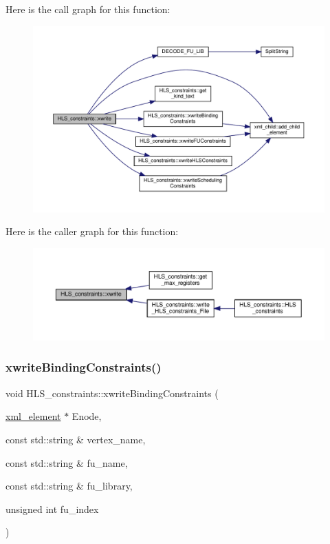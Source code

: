 Here is the call graph for this function\+:
\nopagebreak
\begin{figure}[H]
\begin{center}
\leavevmode
\includegraphics[width=350pt]{dd/d96/classHLS__constraints_ab4c4cb541597b8ac5e28b4309ea1af4b_cgraph}
\end{center}
\end{figure}
Here is the caller graph for this function\+:
\nopagebreak
\begin{figure}[H]
\begin{center}
\leavevmode
\includegraphics[width=350pt]{dd/d96/classHLS__constraints_ab4c4cb541597b8ac5e28b4309ea1af4b_icgraph}
\end{center}
\end{figure}
\mbox{\label{classHLS__constraints_af671c4e42c7fd6dece76dfcb53ce627a}} 
\subsubsection{\texorpdfstring{xwrite\+Binding\+Constraints()}{xwriteBindingConstraints()}}
{\footnotesize\ttfamily void H\+L\+S\+\_\+constraints\+::xwrite\+Binding\+Constraints (\begin{DoxyParamCaption}\item[{\hyperlink{classxml__element}{xml\+\_\+element} $\ast$}]{Enode,  }\item[{const std\+::string \&}]{vertex\+\_\+name,  }\item[{const std\+::string \&}]{fu\+\_\+name,  }\item[{const std\+::string \&}]{fu\+\_\+library,  }\item[{unsigned int}]{fu\+\_\+index }\end{DoxyParamCaption})}



